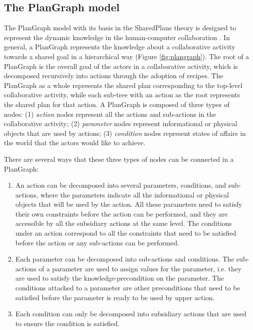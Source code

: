 \subsection{The PlanGraph model} %
\label{sub:the_plangraph_model}
The PlanGraph model with its basis in the SharedPlans theory is designed to represent the dynamic knowledge in the human-computer collaboration \cite{Cai2005}. In general, a PlanGraph represents the knowledge about a collaborative activity towards a shared goal in a hierarchical way (Figure \ref{fig:plangraph}). The root of a PlanGraph is the overall goal of the actors in a collaborative activity, which is decomposed recursively into actions through the adoption of recipes. The PlanGraph as a whole represents the shared plan corresponding to the top-level collaborative activity, while each sub-tree with an action as the root represents the shared plan for that action. A PlanGraph is composed of three types of nodes: (1) \emph{action} nodes represent all the actions and sub-actions in the collaborative activity; (2) \emph{parameter} nodes represent informational or physical objects that are used by actions; (3) \emph{condition} nodes represent states of affairs in the world that the actors would like to achieve.

There are several ways that these three types of nodes can be connected in a PlanGraph:
\begin{enumerate}
	\item An action can be decomposed into several parameters, conditions, and sub-actions, where the parameters indicate all the informational or physical objects that will be used by the action. All these parameters need to satisfy their own constraints before the action can be performed, and they are accessible by all the subsidiary actions at the same level. The conditions under an action correspond to all the constraints that need to be satisfied before the action or any sub-actions can be performed.  
	\item Each parameter can be decomposed into sub-actions and conditions. The sub-actions of a parameter are used to assign values for the parameter, i.e. they are used to satisfy the knowledge-precondition on the parameter. The conditions attached to a parameter are other preconditions that need to be satisfied before the parameter is ready to be used by upper action.
	\item Each condition can only be decomposed into subsidiary actions that are used to ensure the condition is satisfied.
\end{enumerate}

